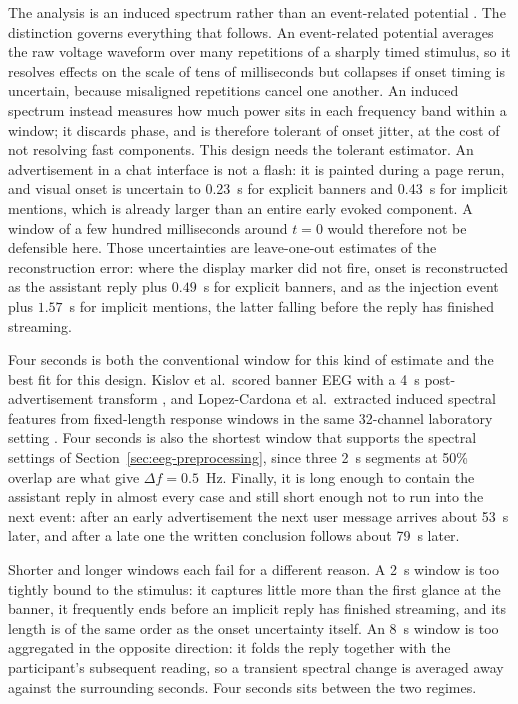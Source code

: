 \documentclass[english]{article}
\begin{document}
The analysis is an induced spectrum rather than an event-related potential \cite{pernet2020cobidas}. The distinction governs everything that follows. An event-related potential averages the raw voltage waveform over many repetitions of a sharply timed stimulus, so it resolves effects on the scale of tens of milliseconds but collapses if onset timing is uncertain, because misaligned repetitions cancel one another. An induced spectrum instead measures how much power sits in each frequency band within a window; it discards phase, and is therefore tolerant of onset jitter, at the cost of not resolving fast components. This design needs the tolerant estimator. An advertisement in a chat interface is not a flash: it is painted during a page rerun, and visual onset is uncertain to 0.23~s for explicit banners and 0.43~s for implicit mentions, which is already larger than an entire early evoked component. A window of a few hundred milliseconds around \(t=0\) would therefore not be defensible here. Those uncertainties are leave-one-out estimates of the reconstruction error: where the display marker did not fire, onset is reconstructed as the assistant reply plus \(0.49\)~s for explicit banners, and as the injection event plus \(1.57\)~s for implicit mentions, the latter falling before the reply has finished streaming.

Four seconds is both the conventional window for this kind of estimate and the best fit for this design. Kislov et al.\ scored banner EEG with a 4~s post-advertisement transform \cite{kislov2023central}, and Lopez-Cardona et al.\ extracted induced spectral features from fixed-length response windows in the same 32-channel laboratory setting \cite{lopezcardona2026vlfeedbackeeg}. Four seconds is also the shortest window that supports the spectral settings of Section~\ref{sec:eeg-preprocessing}, since three 2~s segments at 50\% overlap are what give \(\Delta f=0.5\)~Hz. Finally, it is long enough to contain the assistant reply in almost every case and still short enough not to run into the next event: after an early advertisement the next user message arrives about 53~s later, and after a late one the written conclusion follows about 79~s later.

Shorter and longer windows each fail for a different reason. A 2~s window is too tightly bound to the stimulus: it captures little more than the first glance at the banner, it frequently ends before an implicit reply has finished streaming, and its length is of the same order as the onset uncertainty itself. An 8~s window is too aggregated in the opposite direction: it folds the reply together with the participant's subsequent reading, so a transient spectral change is averaged away against the surrounding seconds. Four seconds sits between the two regimes.
\end{document}
